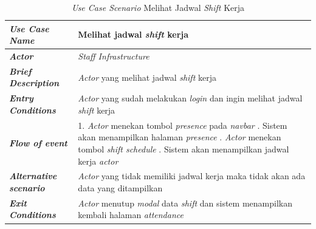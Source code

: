 \FloatBarrier
\begin{longtable}{ |p{6cm}|p{8cm}|}
\caption{\textit{Use Case Scenario} Melihat Jadwal \textit{Shift} Kerja}\label{tab:use-case-scenario-melihat-jadwal-shift-kerja} 
\\
\hline
\textbf{\textit{Use Case Name}}
&Melihat jadwal \textit{shift} kerja
\\ \hline

\textbf{\textit{Actor}}
&\textit{Staff Infrastructure}
\\ \hline

\textbf{\textit{Brief Description}}
&\textit{Actor} yang melihat jadwal \textit{shift} kerja
\\ \hline

\textbf{\textit{Entry Conditions}}
&\textit{Actor} yang sudah melakukan \textit{login} dan ingin melihat jadwal \textit{shift} kerja
\\ \hline

\textbf{\textit{Flow of event}}
&1. \textit{Actor} menekan tombol \textit{presence} pada \textit{navbar}
\newline
2. Sistem akan menampilkan halaman \textit{presence}
\newline
3. \textit{Actor} menekan tombol \textit{shift schedule}
\newline
4. Sistem akan menampilkan jadwal kerja \textit{actor}
\\ \hline

\textbf{\textit{Alternative scenario}}
&\textit{Actor} yang tidak memiliki jadwal kerja maka tidak akan ada data yang ditampilkan
\\ \hline

\textbf{\textit{Exit Conditions}}
&\textit{Actor} menutup \textit{modal} data \textit{shift} dan sistem menampilkan kembali halaman \textit{attendance}
\\ \hline
\end{longtable}

